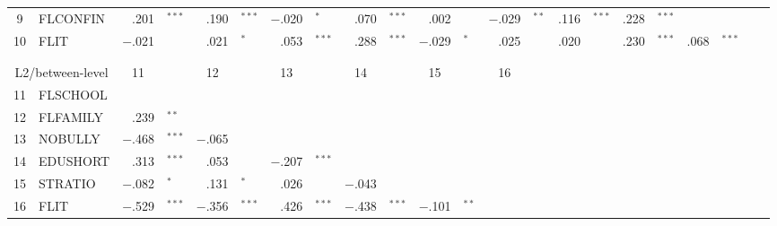 {\begin{tabular}{cl r@{\hskip -0.1mm}l r@{\hskip -0.1mm}l r@{\hskip -0.1mm}l r@{\hskip -0.1mm}l r@{\hskip -0.1mm}l r@{\hskip -0.1mm}l r@{\hskip -0.1mm}l r@{\hskip -0.1mm}l r@{\hskip -0.1mm}l r@{\hskip -0.1mm}l}
            9     & FLCONFIN & .201 & $^{***}$ & .190 & $^{***}$ & $-$.020 & $^{*}$ & .070 & $^{***}$ & .002 &       & $-$.029 & $^{**}$ & .116 & $^{***}$ & .228 & $^{***}$ &       &       &       &  \\
            10    & FLIT  & $-$.021 &       & .021 & $^{*}$ & .053 & $^{***}$ & .288 & $^{***}$ & $-$.029 & $^{*}$ & .025 &       & .020 &       & .230 & $^{***}$ & .068 & $^{***}$ &       &  \\
            \midrule
                  &       &       &       &       &       &       &       &       &       &       &       &       &       &       &       &       &       &       &       &       &  \\
                  &       &       &       &       &       &       &       &       &       &       &       &       &       &       &       &       &       &       &       &       &  \\
        \cmidrule{1-14}    \multicolumn{2}{c}{L2/between-level} & \multicolumn{1}{c}{11} &       & \multicolumn{1}{c}{12} &       & \multicolumn{1}{c}{13} &       & \multicolumn{1}{c}{14} &       & \multicolumn{1}{c}{15} &       & \multicolumn{1}{c}{16} &       &       &       &       &       &       &       &       &  \\
        \cmidrule{1-14}    11    & FLSCHOOL &       &       &       &       &       &       &       &       &       &       &       &       &       &       &       &       &       &       &       &  \\
            12    & FLFAMILY & .239 & $^{**}$ &       &       &       &       &       &       &       &       &       &       &       &       &       &       &       &       &       &  \\
            13    & NOBULLY & $-$.468 & $^{***}$ & $-$.065 &       &       &       &       &       &       &       &       &       &       &       &       &       &       &       &       &  \\
            14    & EDUSHORT & .313 & $^{***}$ & .053 &       & $-$.207 & $^{***}$  &       &       &       &       &       &       &       &       &       &       &       &       &       &  \\
            15    & STRATIO & $-$.082 & $^{*}$ & .131 & $^{*}$ & .026 &       & $-$.043 &       &       &       &       &       &       &       &       &       &       &       &       &  \\
            16    & FLIT  & $-$.529 & $^{***}$ & $-$.356 & $^{***}$ & .426 & $^{***}$ & $-$.438 & $^{***}$ & $-$.101 & $^{**}$ &       &       &       &       &       &       &       &       &       &  \\

\end{tabular}}
